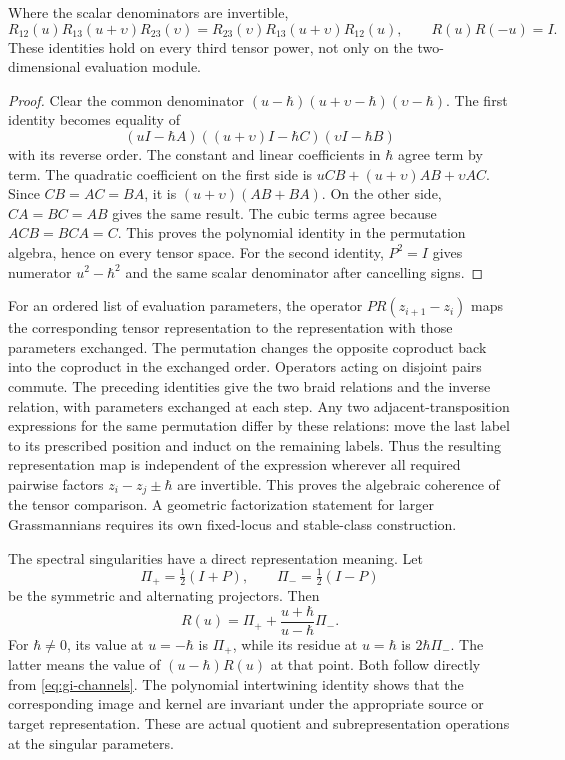 \begin{proposition}\label{prop:gi-yang-baxter}
Where the scalar denominators are invertible,
\[
 R_{12}(u)R_{13}(u+\upsilon)R_{23}(\upsilon)
 =R_{23}(\upsilon)R_{13}(u+\upsilon)R_{12}(u),\qquad
 R(u)R(-u)=I.
\]
These identities hold on every third tensor power, not only on the two-dimensional evaluation module.
\end{proposition}
\begin{proof}
Clear the common denominator $(u-\hbar)(u+\upsilon-\hbar)(\upsilon-\hbar)$.
The first identity becomes equality of
\[
 (uI-\hbar A)((u+\upsilon)I-\hbar C)(\upsilon I-\hbar B)
\]
with its reverse order.
The constant and linear coefficients in $\hbar$ agree term by term.
The quadratic coefficient on the first side is
$uCB+(u+\upsilon)AB+\upsilon AC$.
Since $CB=AC=BA$, it is $(u+\upsilon)(AB+BA)$.
On the other side, $CA=BC=AB$ gives the same result.
The cubic terms agree because $ACB=BCA=C$.
This proves the polynomial identity in the permutation algebra, hence on every tensor space.
For the second identity, $P^2=I$ gives numerator $u^2-\hbar^2$ and the same scalar denominator after cancelling signs.
\end{proof}

For an ordered list of evaluation parameters, the operator $PR(z_{i+1}-z_i)$ maps the corresponding tensor representation to the representation with those parameters exchanged.
The permutation changes the opposite coproduct back into the coproduct in the exchanged order.
Operators acting on disjoint pairs commute.
The preceding identities give the two braid relations and the inverse relation, with parameters exchanged at each step.
Any two adjacent-transposition expressions for the same permutation differ by these relations: move the last label to its prescribed position and induct on the remaining labels.
Thus the resulting representation map is independent of the expression wherever all required pairwise factors $z_i-z_j\pm\hbar$ are invertible.
This proves the algebraic coherence of the tensor comparison.
A geometric factorization statement for larger Grassmannians requires its own fixed-locus and stable-class construction.

The spectral singularities have a direct representation meaning.
Let
\[
 \Pi_+=\tfrac12(I+P),\qquad \Pi_-=\tfrac12(I-P)
\]
be the symmetric and alternating projectors.
Then
\begin{equation}\label{eq:gi-channels}
 R(u)=\Pi_++\frac{u+\hbar}{u-\hbar}\Pi_-.
\end{equation}
For $\hbar\ne0$, its value at $u=-\hbar$ is $\Pi_+$, while its residue at $u=\hbar$ is $2\hbar\Pi_-$.
The latter means the value of $(u-\hbar)R(u)$ at that point.
Both follow directly from \eqref{eq:gi-channels}.
The polynomial intertwining identity shows that the corresponding image and kernel are invariant under the appropriate source or target representation.
These are actual quotient and subrepresentation operations at the singular parameters.

